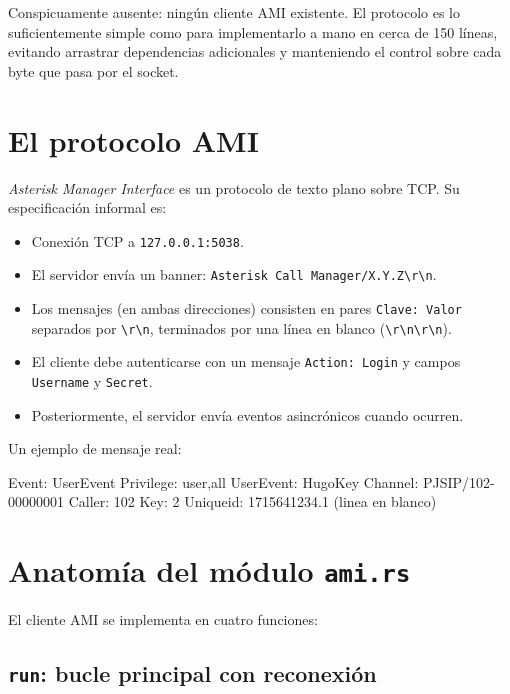 Conspicuamente ausente: ningún cliente AMI existente. El protocolo es lo suficientemente simple como para implementarlo a mano en cerca de 150 líneas, evitando arrastrar dependencias adicionales y manteniendo el control sobre cada byte que pasa por el socket.

\section{El protocolo AMI}

\emph{Asterisk Manager Interface} es un protocolo de texto plano sobre TCP. Su especificación informal es:

\begin{itemize}
  \item Conexión TCP a \texttt{127.0.0.1:5038}.
  \item El servidor envía un banner: \texttt{Asterisk Call Manager/X.Y.Z\textbackslash r\textbackslash n}.
  \item Los mensajes (en ambas direcciones) consisten en pares \texttt{Clave: Valor} separados por \texttt{\textbackslash r\textbackslash n}, terminados por una línea en blanco (\texttt{\textbackslash r\textbackslash n\textbackslash r\textbackslash n}).
  \item El cliente debe autenticarse con un mensaje \texttt{Action: Login} y campos \texttt{Username} y \texttt{Secret}.
  \item Posteriormente, el servidor envía eventos asincrónicos cuando ocurren.
\end{itemize}

Un ejemplo de mensaje real:

\begin{plaincode}
Event: UserEvent
Privilege: user,all
UserEvent: HugoKey
Channel: PJSIP/102-00000001
Caller: 102
Key: 2
Uniqueid: 1715641234.1
(linea en blanco)
\end{plaincode}

\section{Anatomía del módulo \texttt{ami.rs}}

El cliente AMI se implementa en cuatro funciones:

\subsection{\texttt{run}: bucle principal con reconexión}

